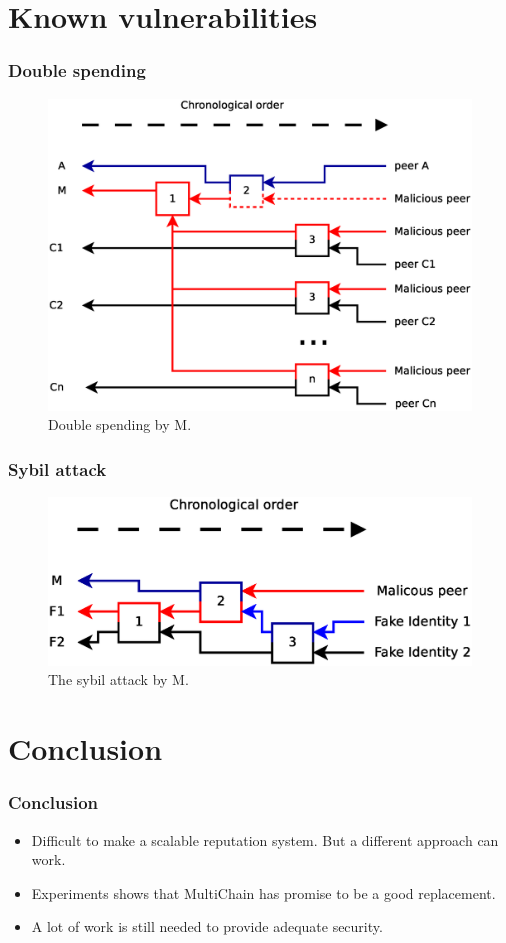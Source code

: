 \documentclass{beamer}
\begin{document}
\section{Known vulnerabilities}

\begin{frame}
\frametitle{Double spending}
\begin{figure}
	\centerline{\includegraphics[scale=0.3]{images/vulnerabilities/branch-multiple.eps}}
	\caption{Double spending by M.}
\end{figure}
\end{frame}

\begin{frame}
\frametitle{Sybil attack}
\begin{figure}
	\centerline{\includegraphics[scale=0.3]{images/vulnerabilities/sybil.eps}}
	\caption{The sybil attack by M.}
	\end{figure}
\end{frame}

\section{Conclusion}

\begin{frame}
\frametitle{Conclusion}
\begin{itemize}
\pause \item{Difficult to make a scalable reputation system. But a different approach can work.}
\pause \item{Experiments shows that MultiChain has promise to be a good replacement.}
\pause \item{A lot of work is still needed to provide adequate security.}
\end{itemize}
\end{frame}
\end{document}
